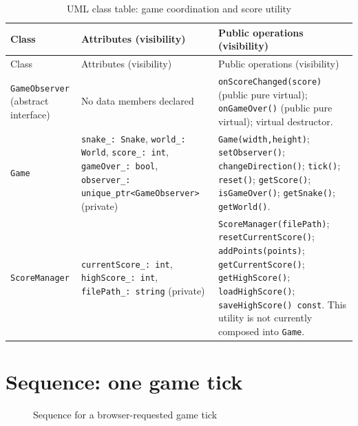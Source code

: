 \documentclass[12pt,a4paper]{report}
\begin{document}
\small
\begin{longtable}{p{28mm}p{54mm}p{73mm}}
\caption{UML class table: game coordination and score utility}\label{tab:uml-services}\\
\toprule
Class & Attributes (visibility) & Public operations (visibility)\\
\midrule
\endfirsthead
\toprule Class & Attributes (visibility) & Public operations (visibility)\\
\midrule
\endhead
\bottomrule
\endfoot
\texttt{GameObserver} (abstract interface) & No data members declared &
\texttt{onScoreChanged(score)} (public pure virtual);
\texttt{onGameOver()} (public pure virtual); virtual destructor.\\
\texttt{Game} & \texttt{snake\_: Snake}, \texttt{world\_: World},
\texttt{score\_: int}, \texttt{gameOver\_: bool},
\texttt{observer\_: unique\_ptr<GameObserver>} (private) &
\texttt{Game(width,height)}; \texttt{setObserver()}; \texttt{changeDirection()};
\texttt{tick()}; \texttt{reset()}; \texttt{getScore()}; \texttt{isGameOver()};
\texttt{getSnake()}; \texttt{getWorld()}.\\
\texttt{ScoreManager} & \texttt{currentScore\_: int}, \texttt{highScore\_: int},
\texttt{filePath\_: string} (private) & \texttt{ScoreManager(filePath)};
\texttt{resetCurrentScore()}; \texttt{addPoints(points)};
\texttt{getCurrentScore()}; \texttt{getHighScore()}; \texttt{loadHighScore()};
\texttt{saveHighScore() const}. This utility is not currently composed into
\texttt{Game}.\\
\end{longtable}
\normalsize

\section{Sequence: one game tick}
\begin{figure}[H]
\centering
{}
\caption{Sequence for a browser-requested game tick}
\label{fig:sequence}
\end{figure}
\end{document}
